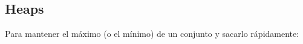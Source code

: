 \subsection{Heaps}
Para mantener el m\'aximo (o el m\'inimo) de un conjunto y sacarlo r\'apidamente:
